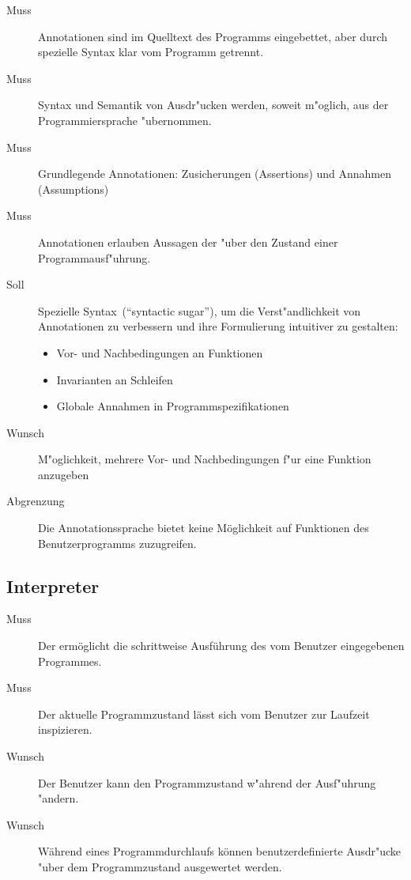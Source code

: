 \begin{description}%
    \item [Muss] Annotationen sind im Quelltext des Programms eingebettet, aber durch spezielle Syntax klar vom Programm getrennt.%
    \item [Muss] Syntax und Semantik von Ausdr"ucken werden, soweit m"oglich, aus der Programmiersprache "ubernommen.%
    \item [Muss] Grundlegende Annotationen: Zusicherungen (Assertions) und Annahmen (Assumptions)%
    \item [Muss] Annotationen erlauben Aussagen der  "uber den Zustand einer Programmausf"uhrung.%
    \item [Soll] Spezielle Syntax~("`syntactic sugar"'), um die Verst"andlichkeit von Annotationen zu verbessern und ihre Formulierung intuitiver zu gestalten:%
        \begin{itemize}%
            \item Vor- und Nachbedingungen an Funktionen%
            \item Invarianten an Schleifen%
            \item Globale Annahmen in Programmspezifikationen%
        \end{itemize}%
    \item [Wunsch] M"oglichkeit, mehrere Vor- und Nachbedingungen f"ur eine Funktion anzugeben%
    \item [Abgrenzung] Die Annotationssprache bietet keine Möglichkeit auf Funktionen des Benutzerprogramms zuzugreifen.%
\end{description}%

\subsection{Interpreter}%

\begin{description}%
    \item[Muss] Der  ermöglicht die schrittweise Ausführung des vom Benutzer eingegebenen Programmes.%
    \item[Muss] Der aktuelle Programmzustand lässt sich vom Benutzer zur Laufzeit inspizieren.%
    \item[Wunsch] Der Benutzer kann den Programmzustand w"ahrend der Ausf"uhrung "andern.%
    \item[Wunsch] Während eines Programmdurchlaufs können benutzerdefinierte Ausdr"ucke "uber dem Programmzustand ausgewertet werden.%
\end{description}%


